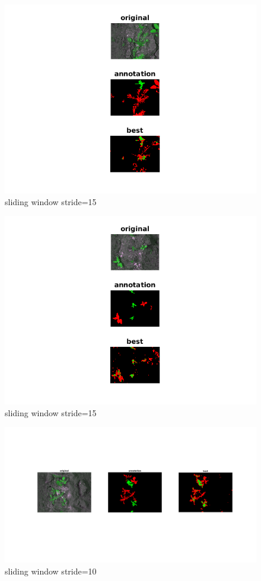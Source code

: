 \documentclass[]{report}
\begin{document}
\begin{figure}[h]
  \includegraphics[width=\linewidth]{1.png}
  \caption{sliding window stride=15}\label{fig: sliding window 15 1}
\end{figure}
\begin{figure}[h]
  \includegraphics[width=\linewidth]{3.png}
  \caption{sliding window stride=15}\label{fig:sliding window 15 2}
\end{figure}

\begin{figure}[h]

  \includegraphics[width=\linewidth]{2.png}
  \caption{sliding window stride=10}\label{fig: sliding window 10 1}
\end{figure}
\end{document}
